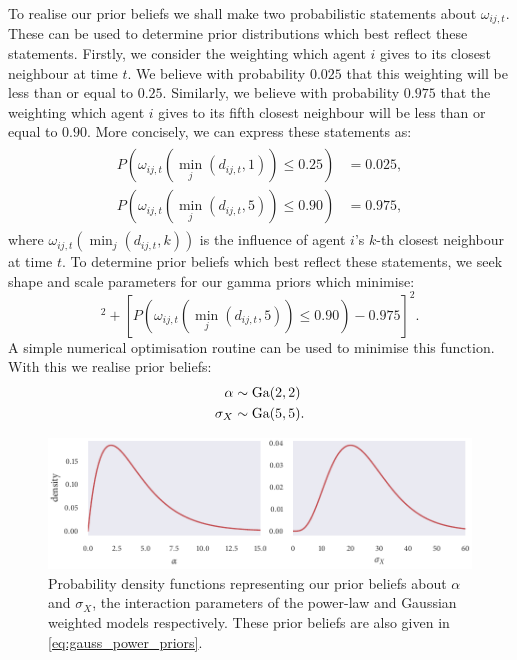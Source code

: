 To realise our prior beliefs we shall make two probabilistic statements about
$\omega_{ij,t}$. These can be used to determine prior distributions which best reflect
these statements. Firstly, we consider the weighting which agent $i$ gives to its closest
neighbour at time $t$. We believe with probability $0.025$ that this weighting will be less
than or equal to $0.25$. Similarly, we believe with probability $0.975$ that the
weighting which agent $i$ gives to its fifth closest neighbour will be less than or equal
to $0.90$.  More concisely, we can express these statements as:
\begin{align}
  \label{eq:omega_statements}
  \begin{split}
    P(\omega_{ij, t}({\min_j(d_{ij,t}, 1)}) \leq 0.25) & = 0.025, \\
    P(\omega_{ij, t}({\min_j(d_{ij,t}, 5)}) \leq 0.90) & = 0.975,
  \end{split}
\end{align}
where $\omega_{ij, t}({\min_j(d_{ij,t}, k)})$ is the influence of agent $i$'s $k$-th
closest neighbour at time $t$. To determine prior beliefs which best reflect these
statements, we seek shape and scale parameters for our gamma priors which minimise:
\begin{equation*}
  [P(\omega_{ij, t}({\min_j(d_{ij,t}, 1)}) \leq 0.25) - 0.025]^2
  + [P(\omega_{ij, t}({\min_j(d_{ij,t}, 5)}) \leq 0.90) - 0.975]^2.
\end{equation*}
A simple numerical optimisation routine can be used to minimise this function. With this
we realise prior beliefs:
\begin{align}
  \label{eq:gauss_power_priors}
  \begin{split}
    \alpha   & \sim \textrm{Ga}(2, 2) \\
    \sigma_X & \sim \textrm{Ga}(5, 5).
  \end{split}
\end{align}

\begin{figure}[tbp]
  \includegraphics{gauss_power_priors.pdf}
  \caption{Probability density functions representing our prior beliefs about $\alpha$
    and $\sigma_X$, the interaction parameters of the power-law and Gaussian weighted
    models respectively. These prior beliefs are also given in
    \cref{eq:gauss_power_priors}.}
  \label{fig:gauss_power_priors}
\end{figure}

